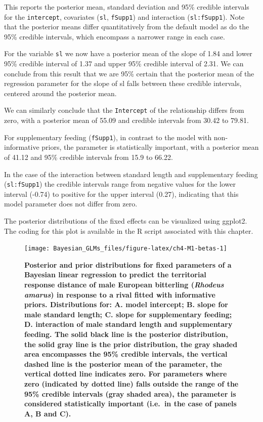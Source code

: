 \documentclass[
]{book}
\begin{document}
This reports the posterior mean, standard deviation and 95\% credible intervals for the \texttt{intercept}, covariates (\texttt{sl}, \texttt{fSupp1}) and interaction (\texttt{sl:fSupp1}). Note that the posterior means differ quantitatively from the default model as do the 95\% credible intervals, which encompass a narrower range in each case.

For the variable \texttt{sl} we now have a posterior mean of the slope of 1.84 and lower 95\% credible interval of 1.37 and upper 95\% credible interval of 2.31. We can conclude from this result that we are 95\% certain that the posterior mean of the regression parameter for the slope of sl falls between these credible intervals, centered around the posterior mean.

We can similarly conclude that the \texttt{Intercept} of the relationship differs from zero, with a posterior mean of 55.09 and credible intervals from 30.42 to 79.81.

For supplementary feeding (\texttt{fSupp1}), in contrast to the model with non-informative priors, the parameter is statistically important, with a posterior mean of 41.12 and 95\% credible intervals from 15.9 to 66.22.

In the case of the interaction between standard length and supplementary feeding (\texttt{sl:fSupp1}) the credible intervals range from negative values for the lower interval (-0.74) to positive for the upper interval (0.27), indicating that this model parameter does not differ from zero.

The posterior distributions of the fixed effects can be visualized using ggplot2. The coding for this plot is available in the R script associated with this chapter.



\begin{figure}

{\centering \texttt{[image: Bayesian\_GLMs\_files/figure-latex/ch4-M1-betas-1]} 

}

\caption{\textbf{Posterior and prior distributions for fixed parameters of a Bayesian linear regression to predict the territorial response distance of male European bitterling (\emph{Rhodeus amarus}) in response to a rival fitted with informative priors. Distributions for: A. model intercept; B. slope for male standard length; C. slope for supplementary feeding; D. interaction of male standard length and supplementary feeding. The solid black line is the posterior distribution, the solid gray line is the prior distribution, the gray shaded area encompasses the 95\% credible intervals, the vertical dashed line is the posterior mean of the parameter, the vertical dotted line indicates zero. For parameters where zero (indicated by dotted line) falls outside the range of the 95\% credible intervals (gray shaded area), the parameter is considered statistically important (i.e.~in the case of panels A, B and C).}}\label{fig:ch4-M1-betas}
\end{figure}
\end{document}
